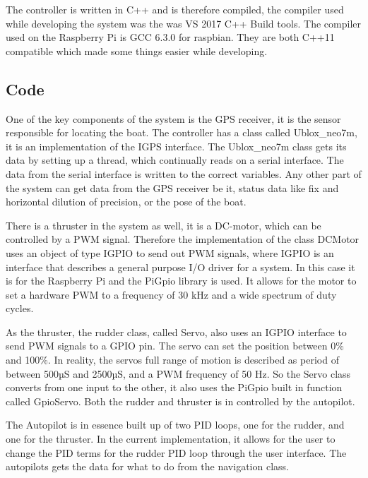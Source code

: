 The controller is written in C++ and is therefore compiled, the compiler used while developing the system was the was VS 2017 C++ Build tools\cite{VC-2017}. The compiler used on the Raspberry Pi is GCC 6.3.0 for raspbian\cite{GCC}. They are both C++11 compatible which made some things easier while developing. 

\subsection{Code}

One of the key components of the system is the GPS receiver, it is the sensor responsible for locating the boat. The controller has a class called Ublox\_neo7m, it is an implementation of the IGPS interface. The Ublox\_neo7m class gets its data by setting up a thread, which continually reads on a serial interface. The data from the serial interface is written to the correct variables. Any other part of the system can get data from the GPS receiver be it, status data like fix and horizontal dilution of precision, or the pose of the boat. 

There is a thruster in the system as well, it is a DC-motor, which can be controlled by a PWM signal. Therefore the implementation of the class DCMotor uses an object of type IGPIO to send out PWM signals, where IGPIO is an interface that describes a general purpose I/O driver for a system. In this case it is for the Raspberry Pi and the PiGpio library is used\cite{pigpio}. It allows for the motor to set a hardware PWM to a frequency of 30 kHz and a wide spectrum of duty cycles.

As the thruster, the rudder class, called Servo, also uses an IGPIO interface to send PWM signals to a GPIO pin. The servo can set the position between 0\% and 100\%. In reality, the servos full range of motion is described as period of between 500µS and 2500µS, and a PWM frequency of 50 Hz. So the Servo class converts from one input to the other, it also uses the PiGpio built in function called GpioServo. Both the rudder and thruster is in controlled by the autopilot.

The Autopilot is in essence built up of two PID loops, one for the rudder, and one for the thruster. In the current implementation, it allows for the user to change the PID terms for the rudder PID loop through the user interface. The autopilots gets the data for what to do from the navigation class.

